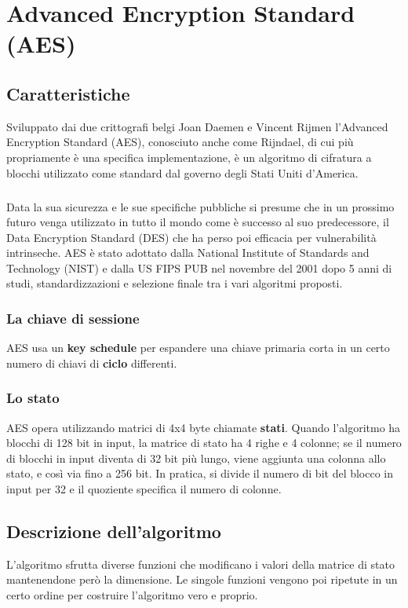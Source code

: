 \chapter{Advanced Encryption Standard (AES)}

\section{Caratteristiche}
Sviluppato dai due crittografi belgi Joan Daemen e Vincent Rijmen l'Advanced Encryption Standard (AES), conosciuto anche come Rijndael, di cui più propriamente è una specifica implementazione, è un algoritmo di cifratura a blocchi utilizzato come standard dal governo degli Stati Uniti d'America. 

\paragraph{}
Data la sua sicurezza e le sue specifiche pubbliche si presume che in un prossimo futuro venga utilizzato in tutto il mondo come è successo al suo predecessore, il Data Encryption Standard (DES) che ha perso poi efficacia per vulnerabilità intrinseche. AES è stato adottato dalla National Institute of Standards and Technology (NIST) e dalla US FIPS PUB nel novembre del 2001 dopo 5 anni di studi, standardizzazioni e selezione finale tra i vari algoritmi proposti.

\subsection{ La chiave di sessione}
AES  usa un \textbf{key schedule} per espandere una chiave primaria corta in un certo numero di chiavi di \textbf{ciclo} differenti. 

\subsection{Lo stato}
AES opera utilizzando matrici di 4x4 byte chiamate \textbf{stati}. Quando l'algoritmo ha blocchi di 128 bit in input, la matrice di stato ha 4 righe e 4 colonne; se il numero di blocchi in input diventa di 32 bit più lungo, viene aggiunta una colonna allo stato, e così via fino a 256 bit. In pratica, si divide il numero di bit del blocco in input per 32 e il quoziente specifica il numero di colonne.

\section{Descrizione dell'algoritmo}
L'algoritmo sfrutta diverse funzioni che modificano i valori della matrice di stato mantenendone però la dimensione. Le singole funzioni vengono poi ripetute in un certo ordine per costruire l'algoritmo vero e proprio.

